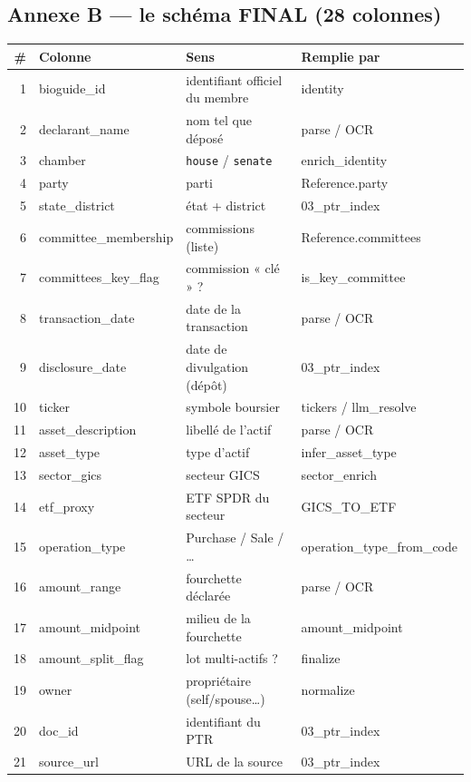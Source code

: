 \documentclass[11pt,a4paper]{article}
\newcommand{\co}[1]{\texttt{\small #1}}
\begin{document}
\subsection{Annexe B — le schéma FINAL (28 colonnes)}
\label{anx:schema}
{\footnotesize
\begin{longtable}{r >{\ttfamily}p{3.3cm} p{8.2cm} >{\ttfamily\scriptsize}p{3.0cm}}
\toprule
\# & \normalfont\bfseries Colonne & \bfseries Sens & \normalfont\bfseries Remplie par \\
\midrule\endhead
1 & bioguide_id & identifiant officiel du membre & identity \\
2 & declarant_name & nom tel que déposé & parse / OCR \\
3 & chamber & \co{house} / \co{senate} & enrich_identity \\
4 & party & parti & Reference.party \\
5 & state_district & état + district & 03\_ptr\_index \\
6 & committee_membership & commissions (liste) & Reference.committees \\
7 & committees_key_flag & commission « clé » ? & is_key_committee \\
8 & transaction_date & date de la transaction & parse / OCR \\
9 & disclosure_date & date de divulgation (dépôt) & 03\_ptr\_index \\
10 & ticker & symbole boursier & tickers / llm_resolve \\
11 & asset_description & libellé de l'actif & parse / OCR \\
12 & asset_type & type d'actif & infer_asset_type \\
13 & sector_gics & secteur GICS & sector_enrich \\
14 & etf_proxy & ETF SPDR du secteur & GICS\_TO\_ETF \\
15 & operation_type & Purchase / Sale / … & operation_type_from_code \\
16 & amount_range & fourchette déclarée & parse / OCR \\
17 & amount_midpoint & milieu de la fourchette & amount_midpoint \\
18 & amount_split_flag & lot multi-actifs ? & finalize \\
19 & owner & propriétaire (self/spouse…) & normalize \\
20 & doc_id & identifiant du PTR & 03\_ptr\_index \\
21 & source_url & URL de la source & 03\_ptr\_index \\

\end{longtable}}
\end{document}

